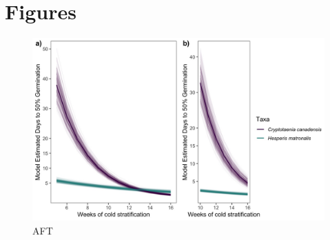 \documentclass{article}\usepackage[]{graphicx}\usepackage[]{color}
\begin{document}
\section*{Figures}
\begin{figure}[h!]
    \centering
          \includegraphics[width=\textwidth]{..//figure/AFTsivansive.jpeg}
\caption{AFT}
    \label{fig:aft}
\end{figure}
\end{document}
